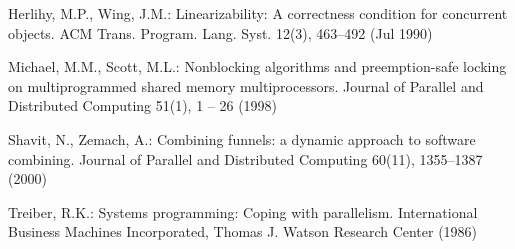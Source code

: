 \documentclass{llncs}
\begin{document}
\begin{thebibliography}{10}
Herlihy, M.P., Wing, J.M.: Linearizability: A correctness condition for
  concurrent objects. ACM Trans. Program. Lang. Syst.  12(3),  463--492 (Jul
  1990)

Michael, M.M., Scott, M.L.: Nonblocking algorithms and preemption-safe locking
  on multiprogrammed shared memory multiprocessors. Journal of Parallel and
  Distributed Computing  51(1),  1 -- 26 (1998)

Shavit, N., Zemach, A.: Combining funnels: a dynamic approach to software
  combining. Journal of Parallel and Distributed Computing  60(11),  1355--1387
  (2000)

Treiber, R.K.: Systems programming: Coping with parallelism. International
  Business Machines Incorporated, Thomas J. Watson Research Center (1986)

\end{thebibliography}

\newpage
\end{document}
